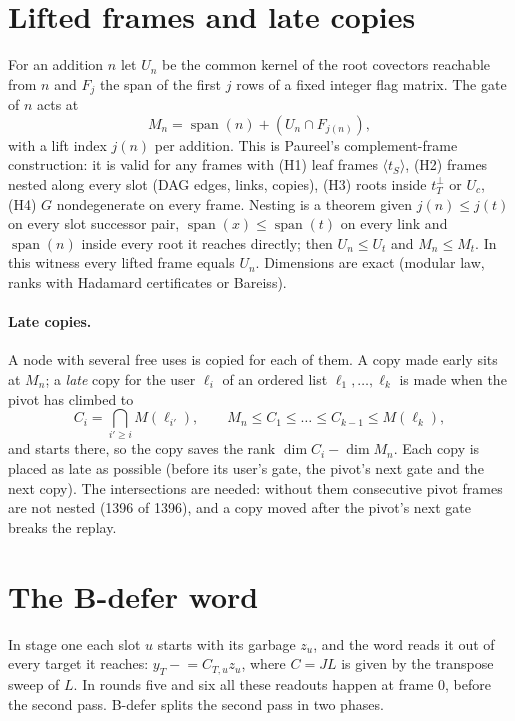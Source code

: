 \documentclass[11pt]{article}
\theoremstyle{remark}\newtheorem*{remark}{Remark}
\begin{document}
\section{Lifted frames and late copies}
For an addition $n$ let $U_n$ be the common kernel of the root covectors reachable from $n$ and $F_j$ the span of
the first $j$ rows of a fixed integer flag matrix. The gate of $n$ acts at
\[ M_n=\operatorname{span}(n)+(U_n\cap F_{j(n)}), \]
with a lift index $j(n)$ per addition. This is Paureel's complement-frame construction: it is valid for any frames
with (H1) leaf frames $\langle t_S\rangle$, (H2) frames nested along every slot (DAG edges, links, copies),
(H3) roots inside $t_T^\perp$ or $U_c$, (H4) $G$ nondegenerate on every frame. Nesting is a theorem given
$j(n)\le j(t)$ on every slot successor pair, $\operatorname{span}(x)\le\operatorname{span}(t)$ on every link and
$\operatorname{span}(n)$ inside every root it reaches directly; then $U_n\le U_t$ and $M_n\le M_t$. In this witness
every lifted frame equals $U_n$. Dimensions are exact (modular law, ranks with Hadamard certificates or Bareiss).

\paragraph{Late copies.} A node with several free uses is copied for each of them. A copy made early sits at $M_n$;
a \emph{late} copy for the user $\ell_i$ of an ordered list $\ell_1,\dots,\ell_k$ is made when the pivot has climbed to
\[ C_i=\textstyle\bigcap_{i'\ge i} M(\ell_{i'}), \qquad M_n\le C_1\le\dots\le C_{k-1}\le M(\ell_k), \]
and starts there, so the copy saves the rank $\dim C_i-\dim M_n$. Each copy is placed as late as possible (before its
user's gate, the pivot's next gate and the next copy). The intersections are needed: without them consecutive pivot
frames are not nested (1396 of 1396), and a copy moved after the pivot's next gate breaks the replay.

\section{The B-defer word}
In stage one each slot $u$ starts with its garbage $z_u$, and the word reads it out of every target it reaches:
$y_T\mathrel{-}=C_{T,u}z_u$, where $C=JL$ is given by the transpose sweep of $L$. In rounds five and six all these
readouts happen at frame $0$, before the second pass. B-defer splits the second pass in two phases.
\end{document}
